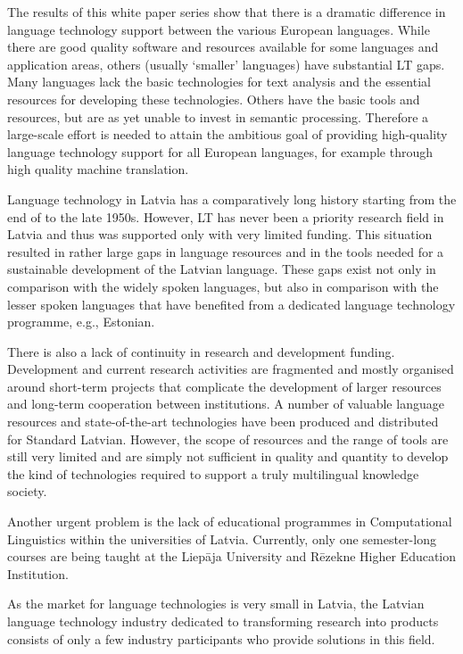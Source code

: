 \begin{multicols}{2}
The results of this white paper series show that there is a dramatic difference in language technology support between the various European languages.
While there are good quality software and resources available for some languages and application areas, others (usually `smaller' languages) have substantial LT gaps.
Many languages lack the basic technologies for text analysis and the essential resources for developing these technologies.
Others have the basic tools and resources, but are as yet unable to invest in semantic processing.
Therefore a large-scale effort is needed to attain the ambitious goal of providing high-quality language technology support for all European languages, for example through high quality machine translation.

Language technology in Latvia has a comparatively long history starting from the end of to the late 1950s.
However, LT has never been a priority research field in Latvia and thus was supported only with very limited funding.
This situation resulted in rather large gaps in language resources and in the tools needed for a sustainable development of the Latvian language.
These gaps exist not only in comparison with the widely spoken languages, but also in comparison with the lesser spoken languages that have benefited from a dedicated language technology programme, e.g., Estonian.

There is also a lack of continuity in research and development funding.
Development and current research activities are fragmented and mostly organised around short-term projects that complicate the development of larger resources and long-term cooperation between institutions.
A number of valuable language resources and state-of-the-art technologies have been produced and distributed for Standard Latvian.
However, the scope of resources and the range of tools are still very limited and are simply not sufficient in quality and quantity to develop the kind of technologies required to support a truly multilingual knowledge society. 

Another urgent problem is the lack of educational programmes in Computational Linguistics within the universities of Latvia.
Currently, only one semester-long courses are being taught at the Liepāja University and Rēzekne Higher Education Institution.

As the market for language technologies is very small in Latvia, the Latvian language technology industry dedicated to transforming research into products consists of only a few industry participants who provide solutions in this field. 


\end{multicols}
